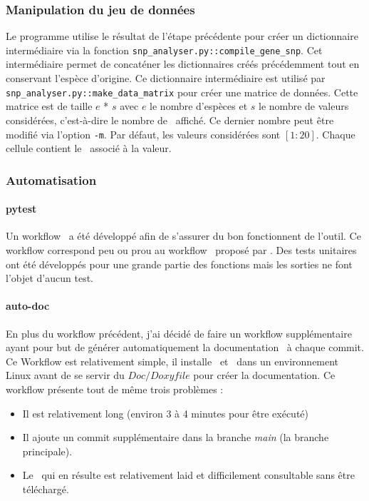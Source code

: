 \documentclass[../main]{subfiles} %
\begin{document}
\subsubsection{Manipulation du jeu de données}
Le programme utilise le résultat de l’étape précédente pour créer un dictionnaire intermédiaire via la fonction \lstinline{snp_analyser.py::compile_gene_snp}. Cet intermédiaire permet de concaténer les dictionnaires créés précédemment tout en conservant l’espèce d’origine.
Ce dictionnaire intermédiaire est utilisé par \lstinline{snp_analyser.py::make_data_matrix} pour créer une matrice de données. Cette matrice est de taille $e$ * $s$  avec $e$ le nombre d’espèces et $s$ le nombre de valeurs considérées, c'est-à-dire le nombre de \NbSNP affiché. Ce dernier nombre peut être modifié via l’option \lstinline{-m}. Par défaut, les valeurs considérées sont $[1:20]$. Chaque cellule contient le \GNSPge associé à la valeur.


\subsubsection{Automatisation}

\paragraph{pytest}
\label{sec:SnpPytest}
Un workflow \pytest a été développé afin de s’assurer du bon fonctionnent de l’outil. Ce workflow correspond peu ou prou au workflow \pytest proposé par \GitHub. Des tests unitaires ont été développés pour une grande partie des fonctions mais les sorties ne font l’objet d’aucun test.

\paragraph{auto-doc}
\label{sec:AutoDoc}
En plus du workflow précédent, j’ai décidé de faire un workflow supplémentaire ayant pour but de générer automatiquement la documentation \Doxygen à chaque \gls{commit}. Ce Workflow est relativement simple, il installe \Doxygen et \Latex dans un environnement Linux avant de se servir du $Doc/Doxyfile$ pour créer la documentation. Ce workflow présente tout de même trois problèmes :
\begin{itemize}
\item Il est relativement long (environ 3 à 4 minutes pour être exécuté)
\item Il ajoute un \gls{commit} supplémentaire dans la branche \textit{main} (la branche principale).
\item Le \pdf qui en résulte est relativement laid et difficilement consultable sans être téléchargé.

\end{itemize}
\end{document}
